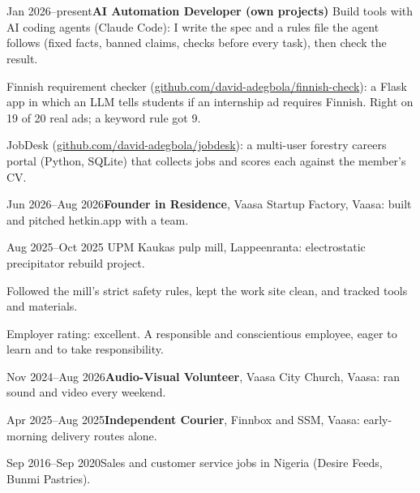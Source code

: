 \documentclass[a4paper,11pt]{article}
\begin{document}
\section{}
\begin{cventry}{Jan 2026--present}{\textbf{AI Automation Developer (own projects)}}
  Build tools with AI coding agents (Claude Code): I write the spec and a rules file the agent follows (fixed facts, banned claims, checks before every task), then check the result.\par
  Finnish requirement checker (\href{https://github.com/david-adegbola/finnish-check}{github.com/david-adegbola/finnish-check}): a Flask app in which an LLM tells students if an internship ad requires Finnish. Right on 19 of 20 real ads; a keyword rule got 9.\par
  JobDesk (\href{https://github.com/david-adegbola/jobdesk}{github.com/david-adegbola/jobdesk}): a multi-user forestry careers portal (Python, SQLite) that collects jobs and scores each against the member's CV.
\end{cventry}
\begin{cventry}{Jun 2026--Aug 2026}{\textbf{Founder in Residence}, Vaasa Startup Factory, Vaasa: built and pitched hetkin.app with a team.}
\end{cventry}
\begin{cventry}{Aug 2025--Oct 2025}{}
  UPM Kaukas pulp mill, Lappeenranta: electrostatic precipitator rebuild project.\par
  Followed the mill's strict safety rules, kept the work site clean, and tracked tools and materials.\par
  Employer rating: excellent. A responsible and conscientious employee, eager to learn and to take responsibility.
\end{cventry}
\begin{cventry}{Nov 2024--Aug 2026}{\textbf{Audio-Visual Volunteer}, Vaasa City Church, Vaasa: ran sound and video every weekend.}
\end{cventry}
\begin{cventry}{Apr 2025--Aug 2025}{\textbf{Independent Courier}, Finnbox and SSM, Vaasa: early-morning delivery routes alone.}
\end{cventry}
\begin{cventry}{Sep 2016--Sep 2020}{Sales and customer service jobs in Nigeria (Desire Feeds, Bunmi Pastries).}
\end{cventry}

\section{}
\end{document}
